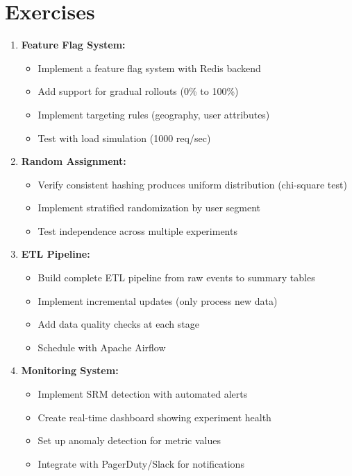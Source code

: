 \section{Exercises}

\begin{enumerate}
    \item \textbf{Feature Flag System:}
    \begin{itemize}
        \item Implement a feature flag system with Redis backend
        \item Add support for gradual rollouts (0\% to 100\%)
        \item Implement targeting rules (geography, user attributes)
        \item Test with load simulation (1000 req/sec)
    \end{itemize}

    \item \textbf{Random Assignment:}
    \begin{itemize}
        \item Verify consistent hashing produces uniform distribution (chi-square test)
        \item Implement stratified randomization by user segment
        \item Test independence across multiple experiments
    \end{itemize}

    \item \textbf{ETL Pipeline:}
    \begin{itemize}
        \item Build complete ETL pipeline from raw events to summary tables
        \item Implement incremental updates (only process new data)
        \item Add data quality checks at each stage
        \item Schedule with Apache Airflow
    \end{itemize}

    \item \textbf{Monitoring System:}
    \begin{itemize}
        \item Implement SRM detection with automated alerts
        \item Create real-time dashboard showing experiment health
        \item Set up anomaly detection for metric values
        \item Integrate with PagerDuty/Slack for notifications
    \end{itemize}


\end{enumerate}
